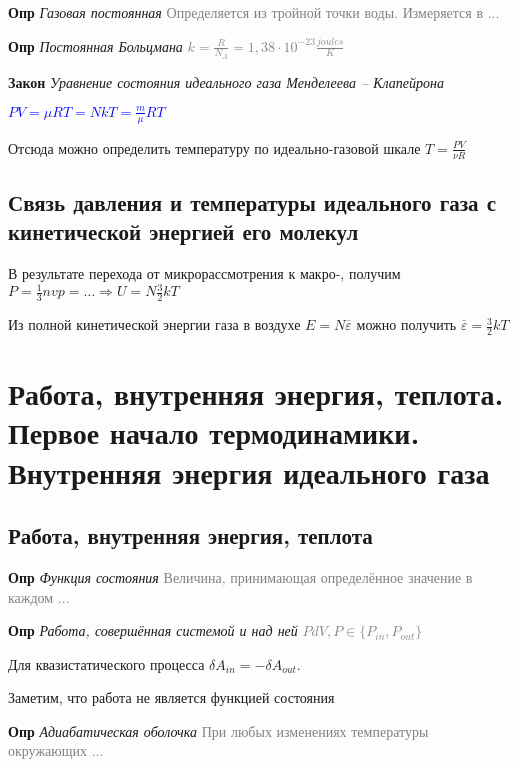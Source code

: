 \documentclass[a4paper, 14pt]{article}
\begin{document}
    \textbf{Опр} \textit{Газовая постоянная} \textcolor{gray}{Определяется из тройной точки воды. Измеряется в ...}

    \textbf{Опр} \textit{Постоянная Больцмана} \textcolor{gray}{$k = \frac{R}{N_A} = 1,38 \cdot 10^{-23} \frac{joules}{K}$}

    \textbf{Закон} \textit{Уравнение состояния идеального газа Менделеева -- Клапейрона}

    \textcolor{blue}{$PV = \mu RT = NkT = \frac{m}{\mu} RT$}

    Отсюда можно определить температуру по идеально-газовой шкале $T = \frac{PV}{\nu R}$

    \subsection{Связь давления и температуры идеального газа с кинетической энергией его молекул}

    В результате перехода от микрорассмотрения к макро-, получим $P = \frac{1}{3}nvp = \dots \Rightarrow U = N \frac{
        3}{2}kT$

    Из полной кинетической энергии газа в воздухе $E = N \overline{\varepsilon}$ можно получить $\overline{
        \varepsilon} = \frac{3}{2}kT$

    \section{Работа, внутренняя энергия, теплота.
    Первое начало термодинамики.
    Внутренняя энергия идеального газа}

    \subsection{Работа, внутренняя энергия, теплота}

    \textbf{Опр} \textit{Функция состояния} \textcolor{gray}{Величина, принимающая определённое значение в каждом ...}

    \textbf{Опр} \textit{Работа, совершённая системой и над ней} \textcolor{gray}{$PdV, P \in \{P_{in}, P_{out} \}$}

    Для квазистатического процесса $\delta A_{in} = - \delta A_{out}$.

    Заметим, что работа не является функцией состояния

    \textbf{Опр} \textit{Адиабатическая оболочка} \textcolor{gray}{При любых изменениях температуры окружающих ...}
\end{document}
